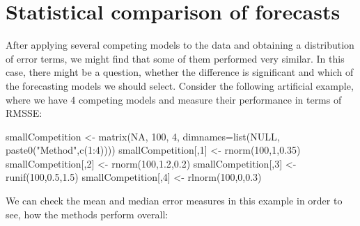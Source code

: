 \documentclass[
]{book}
\newenvironment{Shaded}{\begin{snugshade}}{\end{snugshade}}
\newcommand{\AttributeTok}[1]{\textcolor[rgb]{0.77,0.63,0.00}{#1}}
\newcommand{\ConstantTok}[1]{\textcolor[rgb]{0.00,0.00,0.00}{#1}}
\newcommand{\DecValTok}[1]{\textcolor[rgb]{0.00,0.00,0.81}{#1}}
\newcommand{\FloatTok}[1]{\textcolor[rgb]{0.00,0.00,0.81}{#1}}
\newcommand{\FunctionTok}[1]{\textcolor[rgb]{0.00,0.00,0.00}{#1}}
\newcommand{\NormalTok}[1]{#1}
\newcommand{\OtherTok}[1]{\textcolor[rgb]{0.56,0.35,0.01}{#1}}
\newcommand{\SpecialCharTok}[1]{\textcolor[rgb]{0.00,0.00,0.00}{#1}}
\newcommand{\StringTok}[1]{\textcolor[rgb]{0.31,0.60,0.02}{#1}}
\theoremstyle{definition}
\theoremstyle{definition}
\theoremstyle{definition}
\theoremstyle{definition}
\theoremstyle{remark}
\begin{document}
\hypertarget{statisticalTests}{%
\section{Statistical comparison of forecasts}\label{statisticalTests}}

After applying several competing models to the data and obtaining a distribution of error terms, we might find that some of them performed very similar. In this case, there might be a question, whether the difference is significant and which of the forecasting models we should select. Consider the following artificial example, where we have 4 competing models and measure their performance in terms of RMSSE:

\begin{Shaded}
\begin{Highlighting}[]
\NormalTok{smallCompetition }\OtherTok{\textless{}{-}} \FunctionTok{matrix}\NormalTok{(}\ConstantTok{NA}\NormalTok{, }\DecValTok{100}\NormalTok{, }\DecValTok{4}\NormalTok{,}
                           \AttributeTok{dimnames=}\FunctionTok{list}\NormalTok{(}\ConstantTok{NULL}\NormalTok{,}
                                         \FunctionTok{paste0}\NormalTok{(}\StringTok{"Method"}\NormalTok{,}\FunctionTok{c}\NormalTok{(}\DecValTok{1}\SpecialCharTok{:}\DecValTok{4}\NormalTok{))))}
\NormalTok{smallCompetition[,}\DecValTok{1}\NormalTok{] }\OtherTok{\textless{}{-}} \FunctionTok{rnorm}\NormalTok{(}\DecValTok{100}\NormalTok{,}\DecValTok{1}\NormalTok{,}\FloatTok{0.35}\NormalTok{)}
\NormalTok{smallCompetition[,}\DecValTok{2}\NormalTok{] }\OtherTok{\textless{}{-}} \FunctionTok{rnorm}\NormalTok{(}\DecValTok{100}\NormalTok{,}\FloatTok{1.2}\NormalTok{,}\FloatTok{0.2}\NormalTok{)}
\NormalTok{smallCompetition[,}\DecValTok{3}\NormalTok{] }\OtherTok{\textless{}{-}} \FunctionTok{runif}\NormalTok{(}\DecValTok{100}\NormalTok{,}\FloatTok{0.5}\NormalTok{,}\FloatTok{1.5}\NormalTok{)}
\NormalTok{smallCompetition[,}\DecValTok{4}\NormalTok{] }\OtherTok{\textless{}{-}} \FunctionTok{rlnorm}\NormalTok{(}\DecValTok{100}\NormalTok{,}\DecValTok{0}\NormalTok{,}\FloatTok{0.3}\NormalTok{)}
\end{Highlighting}
\end{Shaded}

We can check the mean and median error measures in this example in order to see, how the methods perform overall:
\end{document}
